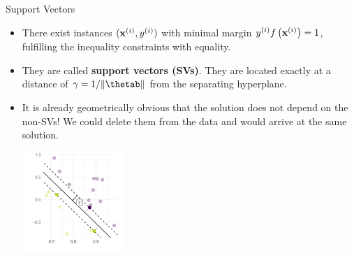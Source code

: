 \documentclass[11pt,compress,t,notes=noshow, xcolor=table]{beamer}
\begin{document}
\begin{vbframe}{Support Vectors}



  \begin{itemize}
    \item There exist instances $(\mathbf{x}^{(i)}, y^{(i)})$ with minimal margin
    $y^{(i)}  f\left(\mathbf{x}^{(i)}\right) = 1$, fulfilling the inequality constraints with equality.
    \item They are called
    \textbf{support vectors (SVs)}. They are located exactly at
    a distance of $\gamma = 1 / \|\thetab\|$ from the separating hyperplane.
    \item It is already geometrically obvious 
      that the solution does not depend on the non-SVs! We could delete them from the data and would arrive at the same solution.
    \vspace{0.5cm}
    

\begin{center}
\includegraphics[width=0.3\textwidth]{figure/support_vectors.png} \\
\end{center}


  \end{itemize}


\end{vbframe}
\end{document}
